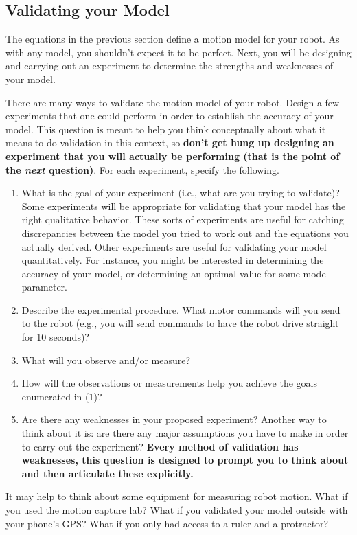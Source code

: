 \documentclass{tufte-handout}
\begin{document}
\subsection{Validating your Model}\label{sec:validating_your_model}
The equations in the previous section define a motion model for your robot.  As with any model, you shouldn't expect it to be perfect.  Next, you will be designing and carrying out an experiment to determine the strengths and weaknesses of your model.
\vspace{1em}
\begin{myboxi}[Exercise 4]
There are many ways to validate the motion model of your robot.  Design a few experiments that one could perform in order to establish the accuracy of your model.  This question is meant to help you think conceptually about what it means to do validation in this context, so \textbf{don't get hung up designing an experiment that you will actually be performing (that is the point of the \emph{next} question)}.  For each experiment, specify the following.
\begin{enumerate}
\item What is the goal of your experiment (i.e., what are you trying to validate)?  Some experiments will be appropriate for validating that your model has the right qualitative behavior.  These sorts of experiments are useful for catching discrepancies between the model you tried to work out and the equations you actually derived.  Other experiments are useful for validating your model quantitatively.  For instance, you might be interested in determining the accuracy of your model, or determining an optimal value for some model parameter.
\item Describe the experimental procedure.  What motor commands will you send to the robot (e.g., you will send commands to have the robot drive straight for 10 seconds)?
\item What will you observe and/or measure?
\item How will the observations or measurements help you achieve the goals enumerated in (1)?
\item Are there any weaknesses in your proposed experiment?  Another way to think about it is: are there any major assumptions you have to make in order to carry out the experiment?  \textbf{Every method of validation has weaknesses, this question is designed to prompt you to think about and then articulate these explicitly.}
\end{enumerate}
It may help to think about some equipment for measuring robot motion.  What if you used the motion capture lab?  What if you validated your model outside with your phone's GPS?  What if you only had access to a ruler and a protractor?
\end{myboxi}
\vspace{1em}
\end{document}
